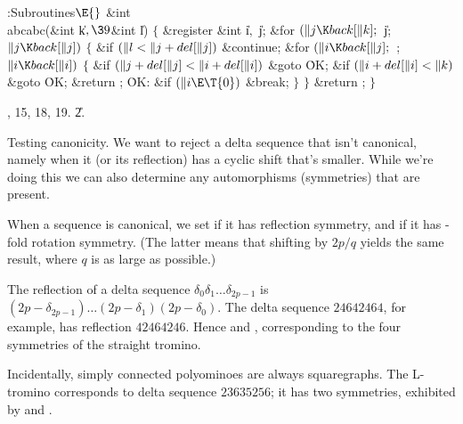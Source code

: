 \B{}:Subroutines\X${}\E{}$\6
\&{int} \\{abcabc}(\&{int} \|k${},\39{}$\&{int} \|l)\1\1\2\2\6
${}\{{}$\1\6
\&{register} \&{int} \|i${},{}$ \|j;\7
\&{for} ${}(\|j\K\\{back}[\|k];{}$ \|j; ${}\|j\K\\{back}[\|j]){}$\5
${}\{{}$\1\6
\&{if} ${}(\|l<\|j+\\{del}[\|j]){}$\1\5
\&{continue};\2\6
\&{for} ${}(\|i\K\\{back}[\|j];{}$  ; ${}\|i\K\\{back}[\|i]){}$\5
${}\{{}$\1\6
\&{if} ${}(\|j+\\{del}[\|j]<\|i+\\{del}[\|i]){}$\1\5
\&{goto} \.{OK};\2\6
\&{if} ${}(\|i+\\{del}[\|i]<\|k){}$\1\5
\&{goto} \.{OK};\2\6
\&{return} ;\6
\4\.{OK}:\5
\&{if} ${}(\|i\E\T{0}){}$\1\5
\&{break};\2\6
\4${}\}{}$\2\6
\4${}\}{}$\2\6
\&{return} ;\6
\4${}\}{}$\2\par
{}, 15, 18, 19.
\U2.\fi

Testing canonicity. We want to reject a delta
sequence that isn't
canonical, namely when it (or its reflection) has a cyclic shift
that's smaller. While we're doing this we can also determine any
automorphisms (symmetries) that are present.

When a sequence is canonical, we set  if it has reflection
symmetry,
and  if it has -fold rotation symmetry. (The latter
means
that shifting by $2p/q$ yields the same result, where $q$ is as large
as possible.)

The reflection of a delta sequence $\delta_0\delta_1\ldots\delta_{2p-1}$ is
$(2p-\delta_{2p-1})\ldots(2p-\delta_1)(2p-\delta_0)$. The delta sequence
$24642464$, for example, has reflection $42464246$.
Hence  and , corresponding to the
four symmetries
of the straight tromino.

Incidentally, simply connected polyominoes are always squaregraphs.
The L-tromino corresponds to delta sequence $23635256$; it has
two symmetries, exhibited by  and .

